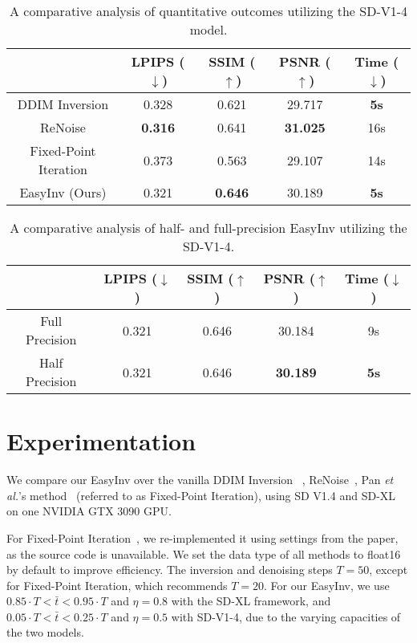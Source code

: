 \documentclass[letterpaper]{article} \usepackage{aaai25}  \usepackage{times}  \usepackage{helvet}  \usepackage{courier}  \usepackage[hyphens]{url}  \usepackage{graphicx} \urlstyle{rm} \def\UrlFont{\rm}  \usepackage{natbib}  \usepackage{caption} \frenchspacing  \setlength{\pdfpagewidth}{8.5in} \setlength{\pdfpageheight}{11in} \usepackage{algorithm}
\begin{document}
\begin{table*}[!t]\tabcolsep=0.4cm
\caption{A comparative analysis of quantitative outcomes utilizing the SD-V1-4 model.}
\centering
 \begin{tabular}{c c c c c} 
 \toprule
 & LPIPS ($\downarrow$) & SSIM ($\uparrow$) & PSNR ($\uparrow$) & Time ($\downarrow$) \\ [0.5ex] 
 \midrule
 DDIM Inversion & 0.328  & 0.621 & 29.717 & \textbf{5s}\\
 \hline
 ReNoise & \textbf{0.316} & 0.641 & \textbf{31.025} & 16s\\
 \hline
 Fixed-Point Iteration & 0.373 & 0.563 & 29.107 & 14s\\
 \hline
 EasyInv (Ours) & 0.321 & \textbf{0.646} & 30.189 & \textbf{5s} \\
 \bottomrule
\end{tabular}
\label{quantitative}
\end{table*}


\begin{table*}[!tb]\tabcolsep=0.4cm
\caption{A comparative analysis of half- and full-precision EasyInv utilizing the SD-V1-4.}
\centering
 \begin{tabular}{c c c c c} 
 \toprule
 & LPIPS ($\downarrow$) & SSIM ($\uparrow$) & PSNR ($\uparrow$) & Time ($\downarrow$) \\ [0.5ex] 
 \midrule
 Full Precision & 0.321 & 0.646 & 30.184 & 9s\\
 \hline
 Half Precision & 0.321 & 0.646 & \textbf{30.189} & \textbf{5s} \\
 \bottomrule
\end{tabular}
\label{precision_table}
\end{table*}


\section{Experimentation}
\label{exp}


We compare our EasyInv over the vanilla DDIM Inversion ~\cite{couairon2023diffedit}, ReNoise~\cite{garibi2024renoise}, Pan \emph{et al.}'s method~\cite{pan2023effective} (referred to as Fixed-Point Iteration), using SD V1.4 and SD-XL on one NVIDIA GTX 3090 GPU. 



For Fixed-Point Iteration~\cite{pan2023effective}, we re-implemented it using settings from the paper, as the source code is unavailable. We set the data type of all methods to float16 by default to improve efficiency. The inversion and denoising steps \(T = 50\), except for Fixed-Point Iteration, which recommends \(T = 20\). For our EasyInv, we use \(0.85 \cdot T < \bar{t} < 0.95 \cdot T\) and \(\eta = 0.8\) with the SD-XL framework, and \(0.05 \cdot T < \bar{t} < 0.25 \cdot T\) and \(\eta = 0.5\) with SD-V1-4, due to the varying capacities of the two models.
\end{document}

